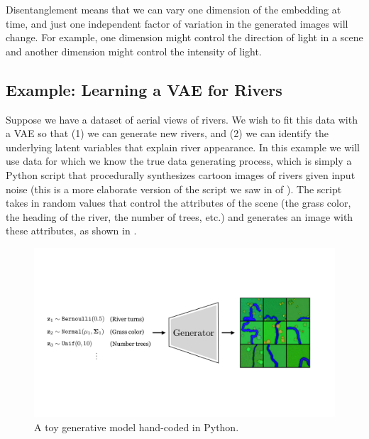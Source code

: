 Disentanglement means that we can vary one dimension of the embedding at time, and just one independent factor of variation in the generated images will change. For example, one dimension might control the direction of light in a scene and another dimension might control the intensity of light.

\subsection{Example: Learning a VAE for Rivers}
Suppose we have a dataset of aerial views of rivers. We wish to fit this data with a VAE so that (1) we can generate new rivers, and (2) we can identify the underlying latent variables that explain river appearance. In this example we will use data for which we know the true data generating process, which is simply a Python script that procedurally synthesizes cartoon images of rivers given input noise (this is a more elaborate version of the script we saw in \algref{\ref{alg:generative_models:simple_rivers_script}} of \chap{\ref{chapter:generative_models}
}). The script takes in random values that control the attributes of the scene (the grass color, the heading of the river, the number of trees, etc.) and generates an image with these attributes, as shown in \fig{\ref{fig:generative_modeling_and_representation_learning:rivers_dataset}}.
\begin{figure}[h!]
    \centerline{
    \includegraphics[width=0.8\linewidth]{./figures/generative_modeling_and_representation_learning/rivers_dataset.pdf}
    }
    \caption{A toy generative model hand-coded in Python.}
    \label{fig:generative_modeling_and_representation_learning:rivers_dataset}
\end{figure}

